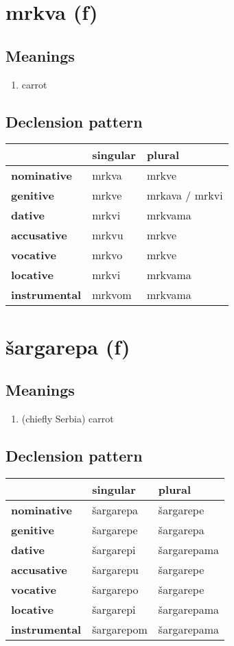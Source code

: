 \filbreak
\section{mrkva (f)}
\subsection*{Meanings}
\begin{enumerate}
\item carrot
\end{enumerate}
\subsection*{Declension pattern}
\begin{tabularx}{\linewidth}{Xll}
\toprule
{} & singular &          plural \\
\midrule
\textbf{nominative  } &    mrkva &           mrkve \\
\textbf{genitive    } &    mrkve &  mrkava / mrkvi \\
\textbf{dative      } &    mrkvi &         mrkvama \\
\textbf{accusative  } &    mrkvu &           mrkve \\
\textbf{vocative    } &    mrkvo &           mrkve \\
\textbf{locative    } &    mrkvi &         mrkvama \\
\textbf{instrumental} &   mrkvom &         mrkvama \\
\bottomrule
\end{tabularx}

\filbreak
\section{šargarepa (f)}
\subsection*{Meanings}
\begin{enumerate}
\item (chiefly Serbia) carrot
\end{enumerate}
\subsection*{Declension pattern}
\begin{tabularx}{\linewidth}{Xll}
\toprule
{} &    singular &       plural \\
\midrule
\textbf{nominative  } &   šargarepa &    šargarepe \\
\textbf{genitive    } &   šargarepe &    šargarepa \\
\textbf{dative      } &   šargarepi &  šargarepama \\
\textbf{accusative  } &   šargarepu &    šargarepe \\
\textbf{vocative    } &   šargarepo &    šargarepe \\
\textbf{locative    } &   šargarepi &  šargarepama \\
\textbf{instrumental} &  šargarepom &  šargarepama \\
\bottomrule
\end{tabularx}

